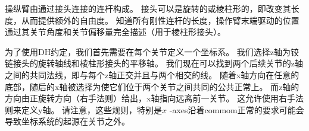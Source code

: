 
操纵臂由通过接头连接的连杆构成。 接头可以是旋转的或棱柱形的，即改变其长度，从而提供额外的自由度。 知道所有刚性连杆的长度，操作臂末端驱动的位置通过其关节角度和关节偏移量完全描述（用于棱柱形接头）。



为了使用DH约定，我们首先需要在每个关节定义一个坐标系。 我们选择z轴为铰链接头的旋转轴线和棱柱形接头的平移轴。 我们现在可以找到两个后续关节的z轴之间的共同法线，即与每个z轴正交并且与两个相交的线。 随着x轴方向在任意的底部，随后的x轴被选择为使它们位于两个关节之间共同的公共正常上。 而z轴的方向由正旋转方向（右手法则）给出，x轴指向远离前一关节。 这允许使用右手法则来定义y轴。 请注意，这些规则，特别是$ x $ -axes沿着commom正常的要求可能会导致坐标系统的起源在关节之外。 

